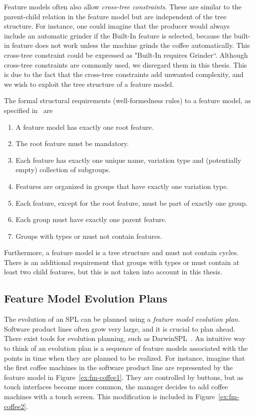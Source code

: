 Feature models often also allow \emph{cross-tree constraints}. These are similar to the parent-child relation in the feature model but are independent of the tree structure. For instance, one could imagine that the producer would always include an automatic grinder if the Built-In feature is selected, because the built-in feature does not work unless the machine grinds the coffee automatically. This cross-tree constraint could be expressed as "Built-In requires Grinder``. Although cross-tree constraints are commonly used, we disregard them in this thesis. This is due to the fact that the cross-tree constraints add unwanted complexity, and we wish to exploit the tree structure of a feature model.

The formal structural requirements (well-formedness rules) to a feature model, as specified in~\cite{art:consistency-preserving-evolution-planning} are 
\begin{enumerate}[\itbf{WF\arabic*}, itemsep=0mm]
   \item A feature model has exactly one root feature.
   \item The root feature must be mandatory.
   \item Each feature has exactly one unique name, variation type and (potentially empty) collection of subgroups.
   \item Features are organized in groups that have exactly one variation type.
   \item Each feature, except for the root feature, must be part of exactly one group.
   \item Each group must have exactly one parent feature.
   \item Groups with types \xortype{} or \ortype{} must not contain \mandatory{} features.
\end{enumerate}

Furthermore, a feature model is a tree structure and must not contain cycles. There is an additional requirement that groups with types \xortype{} or \ortype{} must contain at least two child features, but this is not taken into account in this thesis.

\subsection{Feature Model Evolution Plans}
\label{sub:feature-model-evolution-plans}
The evolution of an SPL can be planned using a \emph{feature model evolution plan}. Software product lines often grow very large, and it is crucial to plan ahead. 
There exist tools for evolution planning, such as DarwinSPL~\cite{art:darwinspl-an-integrated-tool-suite-for-modeling-evolving-context-aware-software-product-lines}. An intuitive way to think of an evolution plan is a sequence of feature models associated with the points in time when they are planned to be realized. For instance, imagine that the first coffee machines in the software product line are represented by the feature model in Figure~\vref{ex:fm-coffee1}. They are controlled by buttons, but as touch interfaces become more common, the manager decides to add coffee machines with a touch screen. This modification is included in Figure~\vref{ex:fm-coffee2}.


